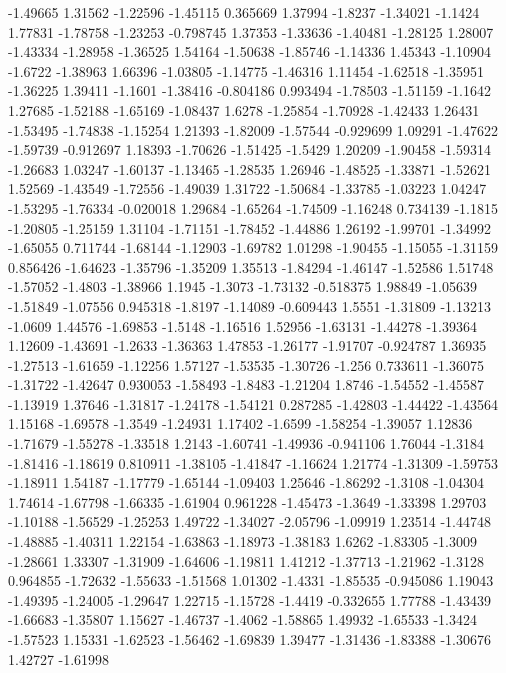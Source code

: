 \documentclass[9pt]{article}
\theoremstyle{plain}
\theoremstyle{definition}
\theoremstyle{remark}
\numberwithin{equation}{section}
\begin{document}
-1.49665
1.31562
-1.22596
-1.45115
0.365669
1.37994
-1.8237
-1.34021
-1.1424
1.77831
-1.78758
-1.23253
-0.798745
1.37353
-1.33636
-1.40481
-1.28125
1.28007
-1.43334
-1.28958
-1.36525
1.54164
-1.50638
-1.85746
-1.14336
1.45343
-1.10904
-1.6722
-1.38963
1.66396
-1.03805
-1.14775
-1.46316
1.11454
-1.62518
-1.35951
-1.36225
1.39411
-1.1601
-1.38416
-0.804186
0.993494
-1.78503
-1.51159
-1.1642
1.27685
-1.52188
-1.65169
-1.08437
1.6278
-1.25854
-1.70928
-1.42433
1.26431
-1.53495
-1.74838
-1.15254
1.21393
-1.82009
-1.57544
-0.929699
1.09291
-1.47622
-1.59739
-0.912697
1.18393
-1.70626
-1.51425
-1.5429
1.20209
-1.90458
-1.59314
-1.26683
1.03247
-1.60137
-1.13465
-1.28535
1.26946
-1.48525
-1.33871
-1.52621
1.52569
-1.43549
-1.72556
-1.49039
1.31722
-1.50684
-1.33785
-1.03223
1.04247
-1.53295
-1.76334
-0.020018
1.29684
-1.65264
-1.74509
-1.16248
0.734139
-1.1815
-1.20805
-1.25159
1.31104
-1.71151
-1.78452
-1.44886
1.26192
-1.99701
-1.34992
-1.65055
0.711744
-1.68144
-1.12903
-1.69782
1.01298
-1.90455
-1.15055
-1.31159
0.856426
-1.64623
-1.35796
-1.35209
1.35513
-1.84294
-1.46147
-1.52586
1.51748
-1.57052
-1.4803
-1.38966
1.1945
-1.3073
-1.73132
-0.518375
1.98849
-1.05639
-1.51849
-1.07556
0.945318
-1.8197
-1.14089
-0.609443
1.5551
-1.31809
-1.13213
-1.0609
1.44576
-1.69853
-1.5148
-1.16516
1.52956
-1.63131
-1.44278
-1.39364
1.12609
-1.43691
-1.2633
-1.36363
1.47853
-1.26177
-1.91707
-0.924787
1.36935
-1.27513
-1.61659
-1.12256
1.57127
-1.53535
-1.30726
-1.256
0.733611
-1.36075
-1.31722
-1.42647
0.930053
-1.58493
-1.8483
-1.21204
1.8746
-1.54552
-1.45587
-1.13919
1.37646
-1.31817
-1.24178
-1.54121
0.287285
-1.42803
-1.44422
-1.43564
1.15168
-1.69578
-1.3549
-1.24931
1.17402
-1.6599
-1.58254
-1.39057
1.12836
-1.71679
-1.55278
-1.33518
1.2143
-1.60741
-1.49936
-0.941106
1.76044
-1.3184
-1.81416
-1.18619
0.810911
-1.38105
-1.41847
-1.16624
1.21774
-1.31309
-1.59753
-1.18911
1.54187
-1.17779
-1.65144
-1.09403
1.25646
-1.86292
-1.3108
-1.04304
1.74614
-1.67798
-1.66335
-1.61904
0.961228
-1.45473
-1.3649
-1.33398
1.29703
-1.10188
-1.56529
-1.25253
1.49722
-1.34027
-2.05796
-1.09919
1.23514
-1.44748
-1.48885
-1.40311
1.22154
-1.63863
-1.18973
-1.38183
1.6262
-1.83305
-1.3009
-1.28661
1.33307
-1.31909
-1.64606
-1.19811
1.41212
-1.37713
-1.21962
-1.3128
0.964855
-1.72632
-1.55633
-1.51568
1.01302
-1.4331
-1.85535
-0.945086
1.19043
-1.49395
-1.24005
-1.29647
1.22715
-1.15728
-1.4419
-0.332655
1.77788
-1.43439
-1.66683
-1.35807
1.15627
-1.46737
-1.4062
-1.58865
1.49932
-1.65533
-1.3424
-1.57523
1.15331
-1.62523
-1.56462
-1.69839
1.39477
-1.31436
-1.83388
-1.30676
1.42727
-1.61998
\end{document}

